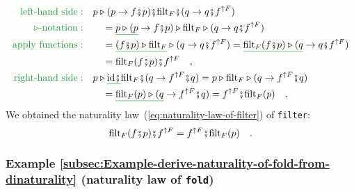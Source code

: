 \begin{align*}
{\color{greenunder}\text{left-hand side}:}\quad & p\triangleright(p\rightarrow f\bef p)\bef\text{filt}_{F}\bef(q\rightarrow q\bef f^{\uparrow F})\\
{\color{greenunder}\triangleright\text{-notation}:}\quad & \quad=\gunderline{p\triangleright(p}\rightarrow f\bef p)\triangleright\text{filt}_{F}\triangleright(q\rightarrow q\bef f^{\uparrow F})\\
{\color{greenunder}\text{apply functions}:}\quad & \quad=\gunderline{(f\bef p)\triangleright\text{filt}_{F}}\triangleright(q\rightarrow q\bef f^{\uparrow F})=\gunderline{\text{filt}_{F}(f\bef p)\triangleright(q}\rightarrow q\bef f^{\uparrow F})\\
 & \quad=\text{filt}_{F}(f\bef p)\bef f^{\uparrow F}\quad,\\
{\color{greenunder}\text{right-hand side}:}\quad & p\triangleright\gunderline{\text{id}\bef}\text{filt}_{F}\bef(q\rightarrow f^{\uparrow F}\bef q)=p\triangleright\text{filt}_{F}\triangleright(q\rightarrow f^{\uparrow F}\bef q)\\
 & \quad=\gunderline{\text{filt}_{F}(p)\triangleright(q}\rightarrow f^{\uparrow F}\bef q)=f^{\uparrow F}\bef\text{filt}_{F}(p)\quad.
\end{align*}
We obtained the naturality law~(\ref{eq:naturality-law-of-filter})
of \lstinline!filter!:
\[
\text{filt}_{F}(f\bef p)\bef f^{\uparrow F}=f^{\uparrow F}\bef\text{filt}_{F}(p)\quad.
\]


\subsubsection{Example \label{subsec:Example-derive-naturality-of-fold-from-dinaturality}\ref{subsec:Example-derive-naturality-of-fold-from-dinaturality}
(naturality law of \lstinline!fold!)}

